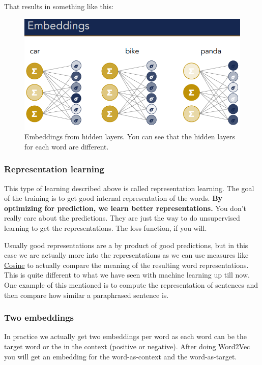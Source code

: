 \documentclass[
  11pt,
  british,
]{article}
\begin{document}
That results in something like this:

\begin{figure}
\centering
\includegraphics{embeddings-from-hidden-layer.png}
\caption{Embeddings from hidden layers. You can see that the hidden
layers for each word are different.}
\end{figure}

\hypertarget{representation-learning}{%
\subsubsection{Representation learning}\label{representation-learning}}

This type of learning described above is called representation learning.
The goal of the training is to get good internal representation of the
words. \textbf{By optimizing for prediction, we learn better
representations.} You don't really care about the predictions. They are
just the way to do unsupervised learning to get the representations. The
loss function, if you will.

Usually good representations are a by product of good predictions, but
in this case we are actually more into the representations as we can use
measures like \href{Cosine.md}{Cosine} to actually compare the meaning
of the resulting word representations. This is quite different to what
we have seen with machine learning up till now. One example of this
mentioned is to compute the representation of sentences and then compare
how similar a paraphrased sentence is.

\hypertarget{two-embeddings}{%
\subsubsection{Two embeddings}\label{two-embeddings}}

In practice we actually get two embeddings per word as each word can be
the target word or the in the context (positive or negative). After
doing Word2Vec you will get an embedding for the word-as-context and the
word-as-target.
\end{document}
